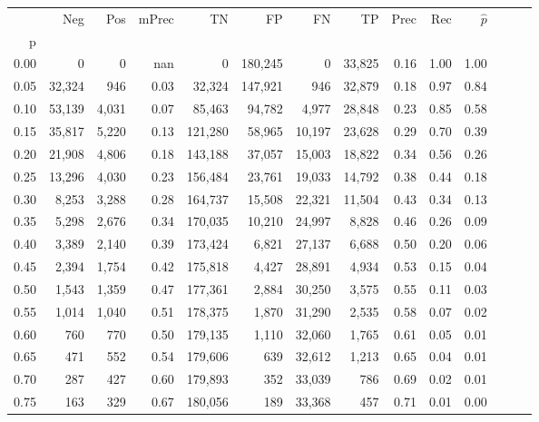 \begin{tabular}{rrrrrrrrrrrrrr}
\toprule
{} &     Neg &    Pos & mPrec &       TN &       FP &      FN &      TP &  Prec &   Rec & $\hat{p}$ \\
p    &         &        &       &          &          &         &         &       &       &           \\
\midrule
0.00 &       0 &      0 &   nan &        0 &  180,245 &       0 &  33,825 &  0.16 &  1.00 &      1.00 \\
0.05 &  32,324 &    946 &  0.03 &   32,324 &  147,921 &     946 &  32,879 &  0.18 &  0.97 &      0.84 \\
0.10 &  53,139 &  4,031 &  0.07 &   85,463 &   94,782 &   4,977 &  28,848 &  0.23 &  0.85 &      0.58 \\
0.15 &  35,817 &  5,220 &  0.13 &  121,280 &   58,965 &  10,197 &  23,628 &  0.29 &  0.70 &      0.39 \\
0.20 &  21,908 &  4,806 &  0.18 &  143,188 &   37,057 &  15,003 &  18,822 &  0.34 &  0.56 &      0.26 \\
0.25 &  13,296 &  4,030 &  0.23 &  156,484 &   23,761 &  19,033 &  14,792 &  0.38 &  0.44 &      0.18 \\
0.30 &   8,253 &  3,288 &  0.28 &  164,737 &   15,508 &  22,321 &  11,504 &  0.43 &  0.34 &      0.13 \\
0.35 &   5,298 &  2,676 &  0.34 &  170,035 &   10,210 &  24,997 &   8,828 &  0.46 &  0.26 &      0.09 \\
0.40 &   3,389 &  2,140 &  0.39 &  173,424 &    6,821 &  27,137 &   6,688 &  0.50 &  0.20 &      0.06 \\
0.45 &   2,394 &  1,754 &  0.42 &  175,818 &    4,427 &  28,891 &   4,934 &  0.53 &  0.15 &      0.04 \\
0.50 &   1,543 &  1,359 &  0.47 &  177,361 &    2,884 &  30,250 &   3,575 &  0.55 &  0.11 &      0.03 \\
0.55 &   1,014 &  1,040 &  0.51 &  178,375 &    1,870 &  31,290 &   2,535 &  0.58 &  0.07 &      0.02 \\
0.60 &     760 &    770 &  0.50 &  179,135 &    1,110 &  32,060 &   1,765 &  0.61 &  0.05 &      0.01 \\
0.65 &     471 &    552 &  0.54 &  179,606 &      639 &  32,612 &   1,213 &  0.65 &  0.04 &      0.01 \\
0.70 &     287 &    427 &  0.60 &  179,893 &      352 &  33,039 &     786 &  0.69 &  0.02 &      0.01 \\
0.75 &     163 &    329 &  0.67 &  180,056 &      189 &  33,368 &     457 &  0.71 &  0.01 &      0.00 \\

\end{tabular}
